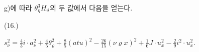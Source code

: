 
g)에 따라 $\theta_\eta^3H_\vartheta$의 두 값에서 다음을 얻는다.
\par\smallskip\noindent
\begin{minipage}[c]{3.6em}
\centering (16.)
\end{minipage}%
\begin{minipage}[c]{\dimexpr\linewidth-3.6em\relax}
\centering
\(\displaystyle
s_\nu^2=\frac43i\cdot a_\nu^2+\frac45\theta_\varrho^2+\frac85(atu)^2-\frac{26}{15}(\nu\varrho x)^2+\frac16J\cdot u_x^2-\frac29i^2\cdot u_x^2.
\)
\end{minipage}
\par\smallskip
